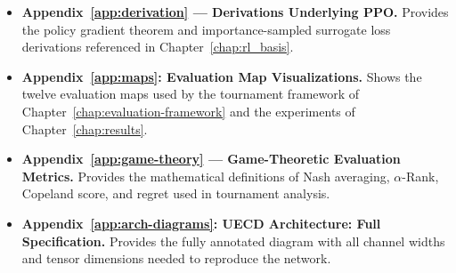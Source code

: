 \begin{itemize}

    \item \textbf{Appendix~\ref{app:derivation} --- Derivations Underlying PPO.} Provides the policy gradient theorem and importance-sampled surrogate loss derivations referenced in Chapter~\ref{chap:rl_basis}.

    \item \textbf{Appendix~\ref{app:maps}: Evaluation Map Visualizations.} Shows the twelve evaluation maps used by the tournament framework of Chapter~\ref{chap:evaluation-framework} and the experiments of Chapter~\ref{chap:results}.

    \item \textbf{Appendix~\ref{app:game-theory} --- Game-Theoretic Evaluation Metrics.} Provides the mathematical definitions of Nash averaging, $\alpha$-Rank, Copeland score, and regret used in tournament analysis.
    
    \item \textbf{Appendix~\ref{app:arch-diagrams}: UECD Architecture: Full Specification.} Provides the fully annotated  diagram with all channel widths and tensor dimensions needed to reproduce the network.
    
\end{itemize}